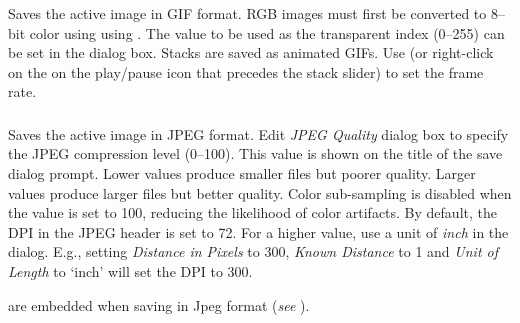 Saves the active image in GIF format.
RGB images must first be converted to 8--bit color using using .
The value to be used as the transparent index (0--255) can be set
in the 
dialog box. Stacks are saved as animated GIFs. Use 
(or right-click on the on the play/pause icon that precedes the stack
slider) to set the frame rate.


\subsubsection{\protect{}\label{sub:Jpeg...}}

Saves the active image in JPEG format. Edit \emph{JPEG
Quality} 
dialog box to specify the JPEG compression level (0--100). This value
is shown on the title of the save dialog prompt. Lower values produce
smaller files but poorer quality. Larger values produce larger files
but better quality. Color sub-sampling is disabled when the value
is set to 100, reducing the likelihood of color artifacts. By default,
the DPI in the JPEG header is set to 72. For a higher
value, use a unit of \emph{inch} in the 
dialog. E.g., setting \emph{Distance in Pixels} to 300,\emph{ Known
Distance} to 1 and \emph{Unit of Length} to `inch' will set the
DPI to 300.

 are embedded when saving in Jpeg format
(\emph{see} ).



